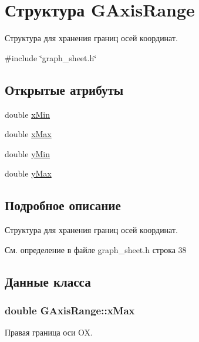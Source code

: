 \hypertarget{struct_g_axis_range}{}\section{Структура G\+Axis\+Range}
\label{struct_g_axis_range}


Структура для хранения границ осей координат.  




{\ttfamily \#include \char`\"{}graph\+\_\+sheet.\+h\char`\"{}}

\subsection*{Открытые атрибуты}
\begin{DoxyCompactItemize}
\item 
double \hyperlink{struct_g_axis_range_a01a9d0fa30092286df72949de7da0d1f}{x\+Min}
\item 
double \hyperlink{struct_g_axis_range_a9ba1a7215788c55bcab90ba3ba87f2de}{x\+Max}
\item 
double \hyperlink{struct_g_axis_range_abc64e1b37194dc086641670a92c62837}{y\+Min}
\item 
double \hyperlink{struct_g_axis_range_a4b2aad8d5fd79b13d555b278ca3b2fb2}{y\+Max}
\end{DoxyCompactItemize}


\subsection{Подробное описание}
Структура для хранения границ осей координат. 

См. определение в файле graph\+\_\+sheet.\+h строка 38



\subsection{Данные класса}
\subsubsection[{\texorpdfstring{x\+Max}{xMax}}]{\setlength{\rightskip}{0pt plus 5cm}double G\+Axis\+Range\+::x\+Max}\hypertarget{struct_g_axis_range_a9ba1a7215788c55bcab90ba3ba87f2de}{}\label{struct_g_axis_range_a9ba1a7215788c55bcab90ba3ba87f2de}
Правая граница оси OX. 

